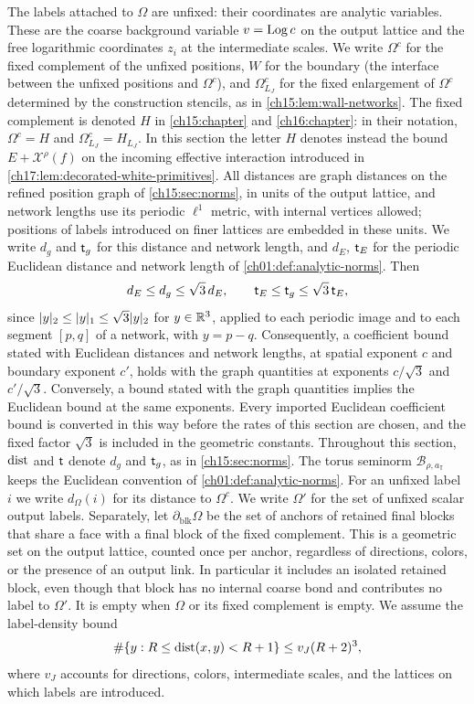 The labels attached to $\Omega$ are unfixed: their coordinates are analytic variables. These are the coarse background variable $v=\operatorname{Log} c$ on the output lattice and the free logarithmic coordinates $z_i$ at the intermediate scales. We write $\Omega^c$ for the fixed complement of the unfixed positions, $W$ for the boundary (the interface between the unfixed positions and $\Omega^c$), and $\Omega^c_{L_J}$ for the fixed enlargement of $\Omega^c$ determined by the construction stencils, as in \cref{ch15:lem:wall-networks}. The fixed complement is denoted $H$ in \cref{ch15:chapter} and \cref{ch16:chapter}: in their notation, $\Omega^c=H$ and $\Omega^c_{L_J}=H_{L_J}$. In this section the letter $H$ denotes instead the bound $E+\mathcal X^\rho(f)$ on the incoming effective interaction introduced in \cref{ch17:lem:decorated-white-primitives}. All distances are graph distances on the refined position graph of \cref{ch15:sec:norms}, in units of the output lattice, and network lengths use its periodic $\ell^1$ metric, with internal vertices allowed; positions of labels introduced on finer lattices are embedded in these units. We write $d_g$ and $\mathsf t_g$ for this distance and network length, and $d_E$, $\mathsf t_E$ for the periodic Euclidean distance and network length of \cref{ch01:def:analytic-norms}. Then
\[
 d_E\le d_g\le\sqrt3\,d_E,\qquad\mathsf t_E\le\mathsf t_g\le\sqrt3\,\mathsf t_E,
\]
since $\lvert y\rvert_2\le\lvert y\rvert_1\le\sqrt3\lvert y\rvert_2$ for $y\in\mathbb R^3$, applied to each periodic image and to each segment $[p,q]$ of a network, with $y=p-q$. Consequently, a coefficient bound stated with Euclidean distances and network lengths, at spatial exponent $c$ and boundary exponent $c'$, holds with the graph quantities at exponents $c/\sqrt3$ and $c'/\sqrt3$. Conversely, a bound stated with the graph quantities implies the Euclidean bound at the same exponents. Every imported Euclidean coefficient bound is converted in this way before the rates of this section are chosen, and the fixed factor $\sqrt3$ is included in the geometric constants. Throughout this section, $\operatorname{dist}$ and $\mathsf t$ denote $d_g$ and $\mathsf t_g$, as in \cref{ch15:sec:norms}. The torus seminorm $\mathcal B_{\rho,a_{\mathbb T}}$ keeps the Euclidean convention of \cref{ch01:def:analytic-norms}. For an unfixed label $i$ we write $d_\Omega(i)$ for its distance to $\Omega^c$. We write $\Omega'$ for the set of unfixed scalar output labels. Separately, let $\partial_{\mathrm{blk}}\Omega$ be the set of anchors of retained final blocks that share a face with a final block of the fixed complement. This is a geometric set on the output lattice, counted once per anchor, regardless of directions, colors, or the presence of an output link. In particular it includes an isolated retained block, even though that block has no internal coarse bond and contributes no label to $\Omega'$. It is empty when $\Omega$ or its fixed complement is empty. We assume the label-density bound
\[
 \#\{y:R\le\operatorname{dist}(x,y)<R+1\}\le v_J(R+2)^3,
\]
where $v_J$ accounts for directions, colors, intermediate scales, and the lattices on which labels are introduced.

